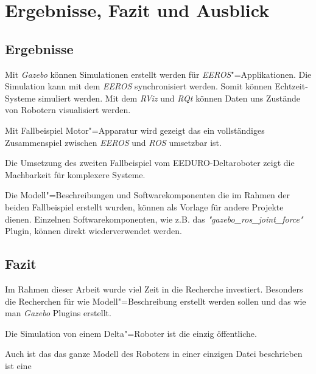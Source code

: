 \chapter{Ergebnisse, Fazit und Ausblick}

\section{Ergebnisse}

Mit \textit{Gazebo} können Simulationen erstellt werden für \textit{EEROS}"=Applikationen.
Die Simulation kann mit dem \textit{EEROS} synchronisiert werden.
Somit können Echtzeit-Systeme simuliert werden.
Mit dem \textit{RViz} und \textit{RQt} können Daten uns Zustände von Robotern visualisiert werden.


Mit Fallbeispiel Motor"=Apparatur wird gezeigt das ein vollständiges Zusammenspiel zwischen \textit{EEROS} und \textit{ROS} umsetzbar ist.

Die Umsetzung des zweiten Fallbeispiel vom EEDURO-Deltaroboter zeigt die Machbarkeit für komplexere Systeme.

Die Modell"=Beschreibungen und Softwarekomponenten die im Rahmen der beiden Fallbeispiel erstellt wurden, können als Vorlage für andere Projekte dienen.
Einzelnen Softwarekomponenten, wie z.B. das \textit{"gazebo\_ros\_joint\_force"} Plugin, können direkt wiederverwendet werden. 



\section{Fazit}
Im Rahmen dieser Arbeit wurde viel Zeit in die Recherche investiert.
Besonders die Recherchen für wie Modell"=Beschreibung erstellt werden sollen und das wie man \textit{Gazebo} Plugins erstellt.

Die Simulation von einem Delta"=Roboter ist die einzig öffentliche.

Auch ist das das ganze Modell des Roboters in einer einzigen Datei beschrieben ist eine  


